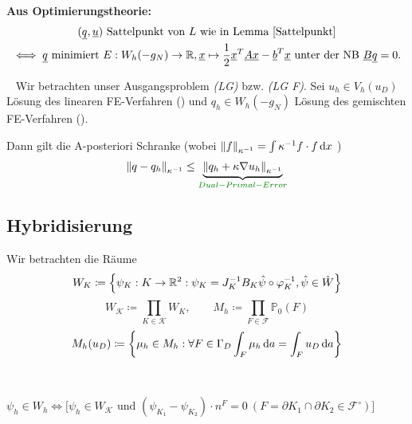 \textbf{Aus Optimierungstheorie:} 
\begin{gather*}
	(\underline{q}, \underline{u}) \text{ Sattelpunkt von } L  \text { wie in Lemma \ref{Sattelpunkt}}\\
	\iff \underline{q} \text{ minimiert } E:W_h(-g_N) \to \mathbb{R} , \underline{x} \mapsto \frac{1}{2} \underline{x}^T \underline{A} \underline{x} - \underline{b}^T \underline{x} \text{ unter der NB } \underline{B} \underline{q} = 0.
\end{gather*}

\begin{Satz} ~\newline
	Wir betrachten unser Ausgangsproblem \emph{(LG)} bzw. \emph{(LG F)}. Sei $ u_h \in V_h(u_D) $ Lösung des linearen FE-Verfahren () und $ q_h \in W_h(-g_N) $ Lösung des gemischten FE-Verfahren (). 
	
	Dann gilt die A-posteriori Schranke (wobei  $ \norm{f}_{\kappa^{-1}} = \int \kappa^{-1} f \cdot f \mathop{}\!\mathrm{d} x $ ) 
	\begin{gather*}
	\norm{q-q_h}_{\kappa^{-1}} \leq \underbrace{\norm{q_h + \kappa \nabla u_h}_{\kappa^{-1}}}_{\defi{Dual-Primal-Error}} 
	\end{gather*}
\end{Satz}


\subsection{Hybridisierung}


Wir betrachten die Räume
	\[W_K \coloneqq \left\{ \psi_K:K \to \mathbb{R}^2: \psi_K = J_K^{-1}  B_K \hat{\psi} \circ \varphi_K^{-1}, \hat{\psi} \in \hat{W} \right\} \]
\[ W_\mathcal{K} \coloneqq \prod_{K \in \mathcal{K}} W_K, \qquad M_h \coloneqq \prod_{F \in \mathcal{F}} \mathbb{P}_0(F) \]
\[ M_h(u_D) \coloneqq \left\{ \mu_h \in M_h:\forall  F \in \Gamma_D \int_F \mu_h \mathop{}\!\mathrm{d} a = \int_F u_D \mathop{}\!\mathrm{d} a  \right\}\]

\begin{remark}~
	
	$ \psi_h \in W_h \iff \big[ \psi_h \in W_{\mathcal{K}} \text{ und }  (\psi_{K_1} - \psi_{K_2}) \cdot n^F = 0 \ (F= \partial K_1 \cap \partial K_2 \in \mathcal{F}^{\circ})\big] $
\end{remark}



